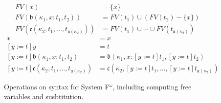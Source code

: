
\begin{figure}
    \centering
    \begin{align*}
        FV(x) &= \{x\} \\
        FV(\mathfrak{b}(\kappa_1, x : t_1, t_2)) &= FV(t_1) \cup (FV(t_2) - \{x\}) \\
        FV(\mathfrak{c}(\kappa_2, t_1, \ldots, t_{\mathfrak{a}(\kappa_2)})) &= FV(t_1) \cup \cdots \cup FV(t_{\mathfrak{a}(\kappa_2)})
    \end{align*}
    \begin{align*}
        [y := t]x &= x \\
        [y := t]y &= t \\
        [y := t]\mathfrak{b}(\kappa_1, x : t_1, t_2) &= \mathfrak{b}(\kappa_1, x : [y := t]t_1, [y := t]t_2)  \\
        [y := t]\mathfrak{c}(\kappa_2, t_1, \ldots, t_{\mathfrak{a}(\kappa_2)}) &= \mathfrak{c}(\kappa_2, [y := t]t_1, \ldots, [y := t]t_{\mathfrak{a}(\kappa_2)})
    \end{align*}
    \caption{Operations on syntax for System F$^\omega$, including computing free variables and susbtitution.}
    \label{fig:ops_f}
\end{figure}
